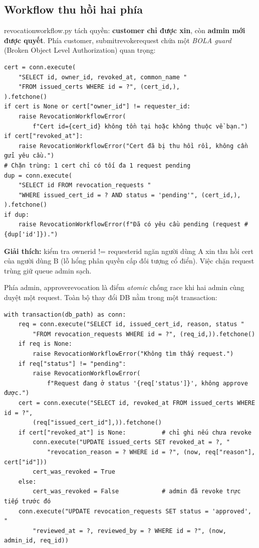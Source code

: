 \documentclass[12pt,a4paper]{article}
\newcommand{\code}[1]{{\ttfamily\small\def\_{\textunderscore\discretionary{}{}{}}#1}}
\begin{document}
\subsection{Workflow thu hồi hai phía}

\code{revocation\_workflow.py} tách quyền: \textbf{customer chỉ được xin}, còn
\textbf{admin mới được quyết}. Phía customer, \code{submit\_revoke\_request}
chứa một \emph{BOLA guard} (Broken Object Level Authorization) quan trọng:

\begin{Verbatim}
cert = conn.execute(
    "SELECT id, owner_id, revoked_at, common_name "
    "FROM issued_certs WHERE id = ?", (cert_id,),
).fetchone()
if cert is None or cert["owner_id"] != requester_id:
    raise RevocationWorkflowError(
        f"Cert id={cert_id} không tồn tại hoặc không thuộc về bạn.")
if cert["revoked_at"]:
    raise RevocationWorkflowError("Cert đã bị thu hồi rồi, không cần gửi yêu cầu.")
# Chặn trùng: 1 cert chỉ có tối đa 1 request pending
dup = conn.execute(
    "SELECT id FROM revocation_requests "
    "WHERE issued_cert_id = ? AND status = 'pending'", (cert_id,),
).fetchone()
if dup:
    raise RevocationWorkflowError(f"Đã có yêu cầu pending (request #{dup['id']}).")
\end{Verbatim}

\textbf{Giải thích:} kiểm tra \code{owner\_id != requester\_id} ngăn người dùng A
xin thu hồi cert của người dùng B (lỗ hổng phân quyền cấp đối tượng cổ điển).
Việc chặn request trùng giữ queue admin sạch.

Phía admin, \code{approve\_revocation} là điểm \emph{atomic} chống race khi hai
admin cùng duyệt một request. Toàn bộ thay đổi DB nằm trong một transaction:

\begin{Verbatim}
with transaction(db_path) as conn:
    req = conn.execute("SELECT id, issued_cert_id, reason, status "
        "FROM revocation_requests WHERE id = ?", (req_id,)).fetchone()
    if req is None:
        raise RevocationWorkflowError("Không tìm thấy request.")
    if req["status"] != "pending":
        raise RevocationWorkflowError(
            f"Request đang ở status '{req['status']}', không approve được.")
    cert = conn.execute("SELECT id, revoked_at FROM issued_certs WHERE id = ?",
        (req["issued_cert_id"],)).fetchone()
    if cert["revoked_at"] is None:          # chỉ ghi nếu chưa revoke
        conn.execute("UPDATE issued_certs SET revoked_at = ?, "
            "revocation_reason = ? WHERE id = ?", (now, req["reason"], cert["id"]))
        cert_was_revoked = True
    else:
        cert_was_revoked = False            # admin đã revoke trực tiếp trước đó
    conn.execute("UPDATE revocation_requests SET status = 'approved', "
        "reviewed_at = ?, reviewed_by = ? WHERE id = ?", (now, admin_id, req_id))
\end{Verbatim}
\end{document}
